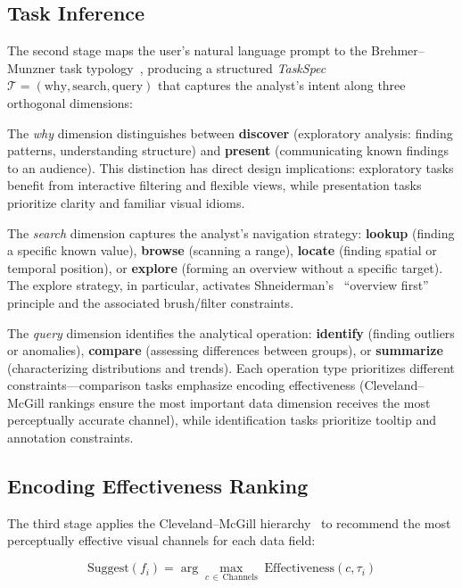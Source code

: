 \documentclass[final,5p,times,twocolumn]{elsarticle}
\begin{document}
\subsection{Task Inference}

The second stage maps the user's natural language prompt to the Brehmer--Munzner task typology~\cite{brehmer2013multi}, producing a structured \textit{TaskSpec} $\mathcal{T} = (\text{why}, \text{search}, \text{query})$ that captures the analyst's intent along three orthogonal dimensions:

The \textit{why} dimension distinguishes between \textbf{discover} (exploratory analysis: finding patterns, understanding structure) and \textbf{present} (communicating known findings to an audience). This distinction has direct design implications: exploratory tasks benefit from interactive filtering and flexible views, while presentation tasks prioritize clarity and familiar visual idioms.

The \textit{search} dimension captures the analyst's navigation strategy: \textbf{lookup} (finding a specific known value), \textbf{browse} (scanning a range), \textbf{locate} (finding spatial or temporal position), or \textbf{explore} (forming an overview without a specific target). The explore strategy, in particular, activates Shneiderman's~\cite{shneiderman1996eyes} ``overview first'' principle and the associated brush/filter constraints.

The \textit{query} dimension identifies the analytical operation: \textbf{identify} (finding outliers or anomalies), \textbf{compare} (assessing differences between groups), or \textbf{summarize} (characterizing distributions and trends). Each operation type prioritizes different constraints---comparison tasks emphasize encoding effectiveness (Cleveland--McGill rankings ensure the most important data dimension receives the most perceptually accurate channel), while identification tasks prioritize tooltip and annotation constraints.

\subsection{Encoding Effectiveness Ranking}

The third stage applies the Cleveland--McGill hierarchy~\cite{cleveland1984graphical} to recommend the most perceptually effective visual channels for each data field:

\begin{equation}
\text{Suggest}(f_i) = \arg\max_{c \,\in\, \text{Channels}} \; \text{Effectiveness}(c, \tau_i)
\label{eq:suggest}
\end{equation}
\end{document}
